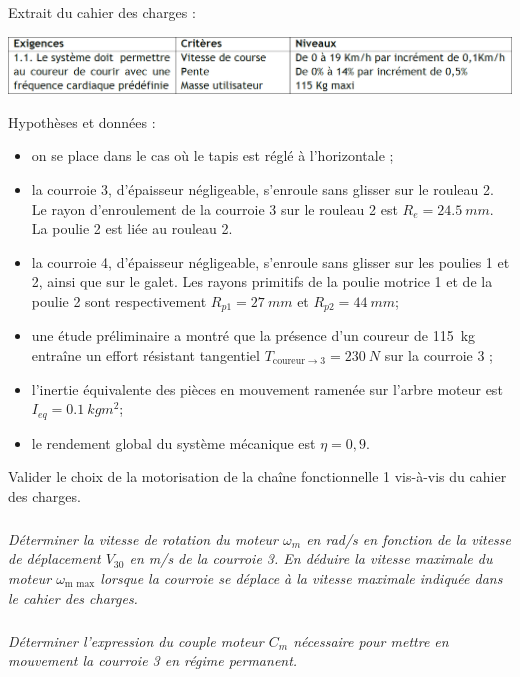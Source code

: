 \documentclass[10pt,fleqn]{article} %
\begin{document}
\begin{multicols}{2}
Extrait du cahier des charges :

\begin{center}
\includegraphics[width=\linewidth]{images/fig_02.png}
\end{center}

Hypothèses et données :
\begin{itemize}
\item on se place dans le cas où le tapis est réglé à l’horizontale ;
\item la courroie 3, d’épaisseur négligeable, s’enroule sans glisser sur le rouleau 2. Le rayon d’enroulement
de la courroie 3 sur le rouleau 2 est $R_e=\SI{24,5}{mm}$. La poulie 2 est liée au rouleau 2.
\item la courroie 4, d’épaisseur négligeable, s’enroule sans glisser sur les poulies 1 et 2, ainsi que sur le galet.
Les rayons primitifs de la poulie motrice 1 et de la poulie 2 sont respectivement $R_{p1}=\SI{27}{mm}$ et
$R_{p2}=\SI{44}{mm}$;
\item une étude préliminaire a montré que la présence d’un coureur de \SI{115}{kg} entraîne un effort résistant
tangentiel $T_{\text{coureur}\to 3}=\SI{230}{N}$ sur la courroie 3 ;
\item l’inertie équivalente des pièces en mouvement ramenée sur l’arbre moteur est $I_{eq}=\SI{0,1}{kg m^2}$;
\item le rendement global du système mécanique est $\eta=0,9$.
\end{itemize}


\begin{obj}
Valider le choix de la motorisation de la chaîne fonctionnelle 1 vis-à-vis du cahier des charges.
\end{obj}


\subparagraph{}
\textit{Déterminer la vitesse de rotation du moteur $\omega_m$ en rad/s en fonction de la vitesse de déplacement
$V_{30}$ en m/s de la courroie 3. En déduire la vitesse maximale du moteur $\omega_{\text{m max}}$ lorsque la courroie se
déplace à la vitesse maximale indiquée dans le cahier des charges.}
\ifprof
\begin{corrige}
\end{corrige}\else\fi


\subparagraph{}
\textit{Déterminer l’expression du couple moteur $C_m$ nécessaire pour mettre en mouvement la courroie 3 en
régime permanent.}
\ifprof
\begin{corrige}
\end{corrige}\else\fi



\end{multicols}
\end{document}

